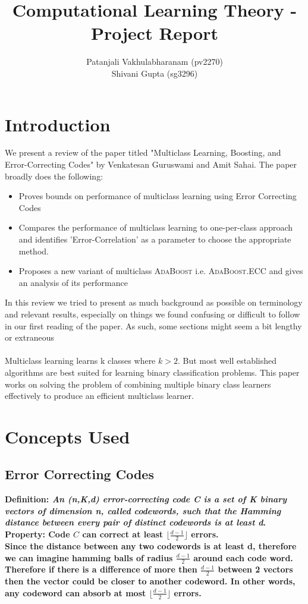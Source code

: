 \documentclass[11pt]{article}
\title{Computational Learning Theory - Project Report}
\author{Patanjali Vakhulabharanam (pv2270)\\ Shivani Gupta (sg3296)}
\begin{document}
\maketitle
\tableofcontents
\newpage
\section{Introduction}
    We present a review of the paper \cite{Guruswami:1999:MLB:307400.307429} titled "Multiclass Learning, Boosting, and Error-Correcting Codes" by Venkatesan Guruswami and Amit Sahai. The paper broadly does the following:
    \begin{itemize}
    \item Proves bounds on performance of multiclass learning using Error Correcting Codes
    \item Compares the performance of multiclass learning to one-per-class approach and identifies 'Error-Correlation' as a parameter to choose the appropriate method.
    \item Proposes a new variant of multiclass \textsc{AdaBoost} i.e. \textsc{AdaBoost}.ECC and gives an analysis of its performance
    \end{itemize}
    In this review we tried to present as much background as possible on terminology and relevant results, especially on things we found confusing or difficult to follow in our first reading of the paper. As such, some sections might seem a bit lengthy or extraneous\\\\
	Multiclass learning learns k classes where $k > 2$. But most well established algorithms are best suited for learning binary classification problems. This paper works on solving the problem of combining multiple binary class learners effectively to produce an efficient multiclass learner.
	
\section{Concepts Used}
    \subsection{Error Correcting Codes}
        \bf Definition: \normalfont \textit {An (n,K,d) error-correcting code C is a set of K binary vectors of dimension n, called codewords, such that the Hamming distance between every pair of distinct codewords is at least d}.\\
        \bf Property: Code $C$ can correct at least $\lfloor \frac{d-1}{2} \rfloor$ errors. \normalfont\\
        Since the distance between any two codewords is at least d, therefore we can imagine hamming balls of radius $\frac{d-1}{2}$ around each code word. Therefore if there is a difference of more then $\frac{d-1}{2}$ between 2 vectors then the vector could be closer to another codeword. In other words, any codeword can absorb at most  $\lfloor \frac{d-1}{2} \rfloor$ errors.\\
\end{document}
